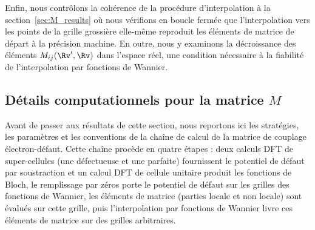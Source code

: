 Enfin, nous contrôlons la cohérence de la procédure d'interpolation à la section~\ref{sec:M_results} où nous vérifions en boucle fermée que l'interpolation vers les points de la grille grossière elle-même reproduit les éléments de matrice de départ à la précision machine. En outre, nous y examinons la décroissance des éléments $M_{ij}(\Rv',\Rv)$ dans l'espace réel, une condition nécessaire à la fiabilité de l'interpolation par fonctions de Wannier.

\subsection{Détails computationnels pour la matrice $M$}\label{sec:M_détails}

Avant de passer aux résultats de cette section, nous reportons ici les stratégies, les paramètres et les conventions de la chaîne de calcul de la matrice de couplage électron-défaut. Cette chaîne procède en quatre étapes : deux calculs DFT de super-cellules (une défectueuse et une parfaite) fournissent le potentiel de défaut par soustraction et un calcul DFT de cellule unitaire produit les fonctions de Bloch, le remplissage par zéros porte le potentiel de défaut sur les grilles des fonctions de Wannier, les éléments de matrice (parties locale et non locale) sont évalués sur cette grille, puis l'interpolation par fonctions de Wannier livre ces éléments de matrice sur des grilles arbitraires.


